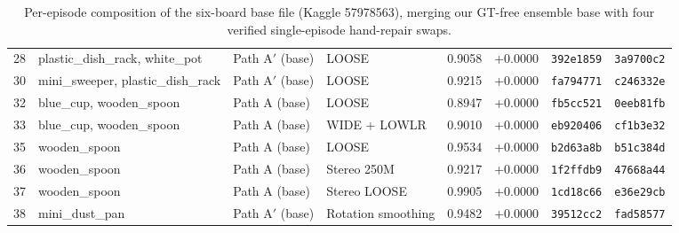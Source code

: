 \documentclass[10pt]{nvidiaextabstract}
\begin{document}
\begin{table}[h]
{\begin{tabular}{@{}rlllrrll@{}}
    28 & plastic\_dish\_rack, white\_pot   & Path A$'$ (base) & LOOSE                & 0.9058 & +0.0000 & \texttt{392e1859} & \texttt{3a9700c2} \\
    30 & mini\_sweeper, plastic\_dish\_rack& Path A$'$ (base) & LOOSE                & 0.9215 & +0.0000 & \texttt{fa794771} & \texttt{c246332e} \\
    32 & blue\_cup, wooden\_spoon          & Path A (base)    & LOOSE                & 0.8947 & +0.0000 & \texttt{fb5cc521} & \texttt{0eeb81fb} \\
    33 & blue\_cup, wooden\_spoon          & Path A (base)    & WIDE + LOWLR         & 0.9010 & +0.0000 & \texttt{eb920406} & \texttt{cf1b3e32} \\
    35 & wooden\_spoon                     & Path A (base)    & LOOSE                & 0.9534 & +0.0000 & \texttt{b2d63a8b} & \texttt{b51c384d} \\
    36 & wooden\_spoon                     & Path A (base)    & Stereo 250M          & 0.9217 & +0.0000 & \texttt{1f2ffdb9} & \texttt{47668a44} \\
    37 & wooden\_spoon                     & Path A (base)    & Stereo LOOSE         & 0.9905 & +0.0000 & \texttt{1cd18c66} & \texttt{e36e29cb} \\
    38 & mini\_dust\_pan                   & Path A$'$ (base) & Rotation smoothing   & 0.9482 & +0.0000 & \texttt{39512cc2} & \texttt{fad58577} \\
    \bottomrule
  \end{tabular}}
  \caption{Per-episode composition of the six-board base file (Kaggle 57978563), merging our GT-free ensemble base with four verified single-episode hand-repair swaps.}
  \label{tab:provenance}
\end{table}
\end{document}
